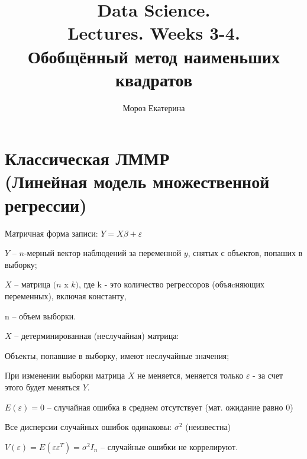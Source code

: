 \documentclass{article}
\title{Data Science.\\
Lectures. Weeks 3-4. \\Обобщённый метод наименьших квадратов}
\author{Мороз Екатерина}
\date{}
\begin{document}
\maketitle

\setcounter{tocdepth}{2} %
\renewcommand\contentsname{Contents}
\tableofcontents
\newpage


\section{Классическая ЛММР \texorpdfstring{\\ (Линейная модель множественной регрессии)}{}}
Матричная форма записи:
$Y = X \beta + \varepsilon$ \par
$Y$ -- $n$-мерный вектор наблюдений за переменной $y$, снятых с объектов, попаших в выборку; \par
$X$ -- матрица $(n$ x $k)$, где k - это количество регрессоров (объяcняющих переменных), включая константу, \par
n -- объем выборки.\par

\vspace{2mm}
$X$ -- детерминированная (неслучайная) матрица: \par
Объекты, попавшие в выборку, имеют неслучайные значения; \par
При изменении выборки матрица $X$ не меняется, меняется только $\varepsilon$ - за счет этого будет меняться $Y$.\par

\vspace{2mm}
$E(\varepsilon) = 0$ -- случайная ошибка в среднем отсутствует (мат. ожидание равно 0)\par
Все дисперсии случайных ошибок одинаковы: $\sigma^2$ (неизвестна)\par
$V(\varepsilon) = E(\varepsilon\varepsilon^T)=\sigma^2I_n$ -- случайные ошибки не коррелируют. 

\vspace{2mm}
\end{document}

